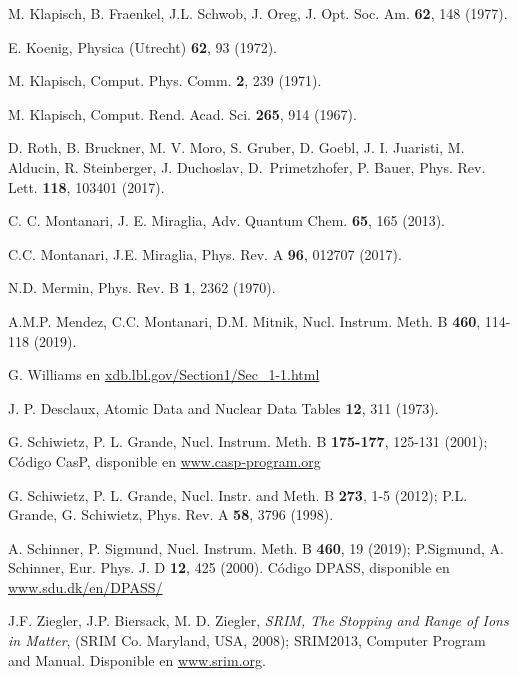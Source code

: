 \begin{thebibliography}{9}
M. Klapisch, B. Fraenkel, J.L. Schwob, J. Oreg,
J. Opt. Soc. Am. \textbf{62}, 148 (1977).

E. Koenig,
Physica (Utrecht) \textbf{62}, 93 (1972).

M. Klapisch,
Comput. Phys. Comm. \textbf{2}, 239 (1971).

M. Klapisch,
Comput. Rend. Acad. Sci. \textbf{265}, 914 (1967).

D. Roth, B. Bruckner, M. V. Moro, S. Gruber, D. Goebl, J. I. Juaristi,
M. Alducin, R. Steinberger, J. Duchoslav, \mbox{D. Primetzhofer}, P. Bauer,
Phys. Rev. Lett. \textbf{118}, 103401 (2017).

C. C. Montanari, J. E. Miraglia,
Adv. Quantum Chem. \textbf{65}, 165 (2013).

C.C. Montanari, J.E. Miraglia, 
Phys. Rev. A \textbf{96}, 012707 (2017).

N.D. Mermin, 
Phys. Rev. B \textbf{1}, 2362 (1970).

A.M.P. Mendez, C.C. Montanari, D.M. Mitnik, 
Nucl. Instrum. Meth. B \textbf{460}, 114-118 (2019).

G. Williams en 
\href{http://xdb.lbl.gov/Section1/Sec\_1-1.html}{xdb.lbl.gov/Section1/Sec\_1-1.html}

J. P. Desclaux,
Atomic Data and Nuclear Data Tables \textbf{12}, 311 (1973).

G. Schiwietz, P. L. Grande, 
Nucl. Instrum. Meth. B \textbf{175-177}, 125-131 (2001); 
Código CasP, disponible en \href{https://www.casp-program.org}{www.casp-program.org}

G. Schiwietz, P. L. Grande,
Nucl. Instr. and Meth. B \textbf{273}, 1-5 (2012); 
P.L. Grande, G. Schiwietz, 
Phys. Rev. A \textbf{58}, 3796 (1998).

A. Schinner, P. Sigmund, 
Nucl. Instrum. Meth. B \textbf{460}, 19 (2019); 
P.Sigmund, A. Schinner, 
Eur. Phys. J. D \textbf{12}, 425 (2000). 
Código DPASS, disponible en \href{https://www.sdu.dk/en/DPASS/}{www.sdu.dk/en/DPASS/}

J.F. Ziegler, J.P. Biersack, M. D. Ziegler, 
\textit{SRIM, The Stopping and Range of Ions in Matter}, 
(SRIM Co. Maryland, USA, 2008); 
SRIM2013, Computer Program and Manual. Disponible en \href{https://www.srim.org}{www.srim.org}.


\end{thebibliography}
